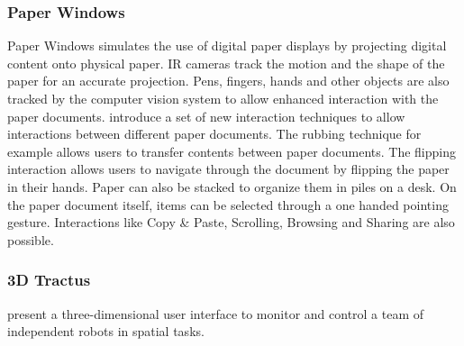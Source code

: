 \subsubsection{Paper Windows}
Paper Windows simulates the use of digital paper displays by projecting digital content onto physical paper. IR cameras track the motion and the shape of the paper for an accurate projection. Pens, fingers, hands and other objects are also tracked by the computer vision system to allow enhanced interaction with the paper documents. \cite{holman05} introduce a set of new interaction techniques to allow interactions between different paper documents. The rubbing technique for example allows users to transfer contents between paper documents. The flipping interaction allows users to navigate through the document by flipping the paper in their hands. Paper can also be stacked to organize them in piles on a desk. On the paper document itself, items can be selected through a one handed pointing gesture. Interactions like Copy \& Paste, Scrolling, Browsing and Sharing are also possible. 

\subsubsection{3D Tractus}
\cite{lapides00} present a three-dimensional user interface to monitor and control a team of independent robots in spatial tasks. 